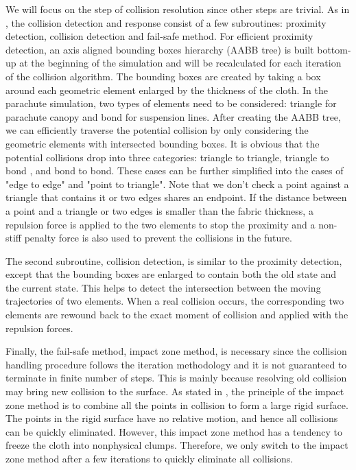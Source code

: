 We will focus on the step of collision resolution since other steps are trivial. As in \cite{Bridson02}, the collision detection and response consist of a few subroutines: proximity detection, collision detection and fail-safe method. For efficient proximity detection, an axis aligned bounding boxes hierarchy (AABB tree) is built bottom-up at the beginning of the simulation and will be recalculated for each iteration of the collision algorithm. The bounding boxes are created by taking a box around each geometric element enlarged by the thickness of the cloth. In the parachute simulation, two types of elements need to be considered: triangle for parachute canopy and bond for suspension lines. After creating the AABB tree, we can efficiently traverse the potential collision by only considering the geometric elements with intersected bounding boxes. It is obvious that the potential collisions drop into three categories: triangle to triangle, triangle to bond , and bond to bond. These cases can be further simplified into the cases of "edge to edge" and "point to triangle". Note that we don't check a point against a triangle that contains it or two edges shares an endpoint. If the distance between a point and a triangle or two edges is smaller than the fabric thickness, a repulsion force is applied to the two elements to stop the proximity and a non-stiff penalty force is also used to prevent the collisions in the future. 

The second subroutine, collision detection, is similar to the proximity detection, except that the bounding boxes are enlarged to contain both the old state and the current state. This helps to detect the intersection between the moving trajectories of two elements. When a real collision occurs, the corresponding two elements are rewound back to the exact moment of collision and applied with the repulsion forces. 

Finally, the fail-safe method, impact zone method, is necessary since the collision handling procedure follows the iteration methodology and it is not guaranteed to terminate in finite number of steps. This is mainly because resolving old collision may bring new collision to the surface. As stated in \cite{}, the principle of the impact zone method is to combine all the points in collision to form a large rigid surface. The points in the rigid surface have no relative motion, and hence all collisions can be quickly eliminated. However, this impact zone method has a tendency to freeze the cloth into nonphysical clumps. Therefore, we only switch to the impact zone method after a few iterations to quickly eliminate all collisions.

